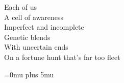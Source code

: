 \documentclass[twoside,frontopenright,halfspacing, openany]{ip3thesis}
\begin{document}
\begin{epigraph*}

Each of us\\
A cell of awareness\\
Imperfect and incomplete\\
Genetic blends\\
With uncertain ends\\
On a fortune hunt that's far too fleet

\end{epigraph*}










\appendix


\Urlmuskip=0mu plus 5mu\relax


\end{document}
